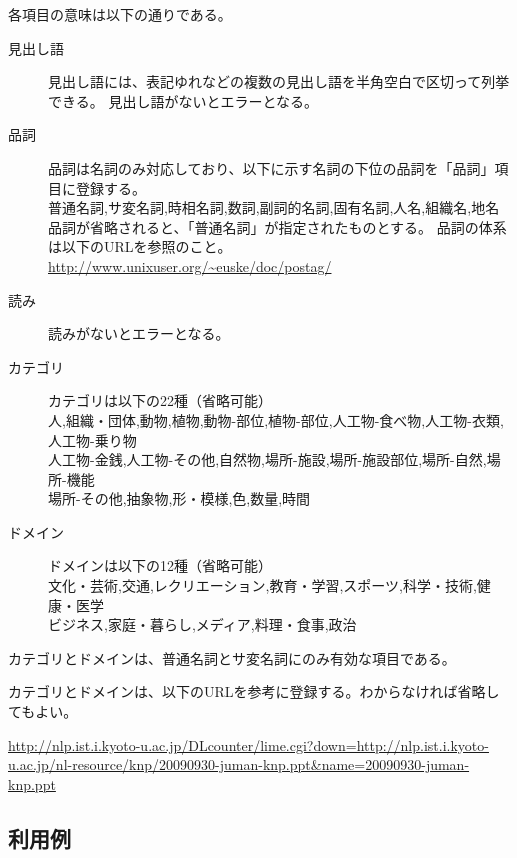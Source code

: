 各項目の意味は以下の通りである。

\begin{description}
\item[見出し語]
見出し語には、表記ゆれなどの複数の見出し語を半角空白で区切って列挙できる。
見出し語がないとエラーとなる。
\item[品詞]
品詞は名詞のみ対応しており、以下に示す名詞の下位の品詞を「品詞」項目に登録する。\\
普通名詞,サ変名詞,時相名詞,数詞,副詞的名詞,固有名詞,人名,組織名,地名\\
品詞が省略されると、「普通名詞」が指定されたものとする。
品詞の体系は以下のURLを参照のこと。
\url{http://www.unixuser.org/~euske/doc/postag/}
\item[読み]
読みがないとエラーとなる。
\item[カテゴリ]
カテゴリは以下の22種（省略可能）\\
人,組織・団体,動物,植物,動物-部位,植物-部位,人工物-食べ物,人工物-衣類,人工物-乗り物\\
人工物-金銭,人工物-その他,自然物,場所-施設,場所-施設部位,場所-自然,場所-機能\\
場所-その他,抽象物,形・模様,色,数量,時間
\item[ドメイン]
ドメインは以下の12種（省略可能）\\
文化・芸術,交通,レクリエーション,教育・学習,スポーツ,科学・技術,健康・医学\\
ビジネス,家庭・暮らし,メディア,料理・食事,政治\\
\end{description}

カテゴリとドメインは、普通名詞とサ変名詞にのみ有効な項目である。

カテゴリとドメインは、以下のURLを参考に登録する。わからなければ省略してもよい。

\url{http://nlp.ist.i.kyoto-u.ac.jp/DLcounter/lime.cgi?down=http://nlp.ist.i.kyoto-u.ac.jp/nl-resource/knp/20090930-juman-knp.ppt&name=20090930-juman-knp.ppt}






\subsection{利用例}


%

